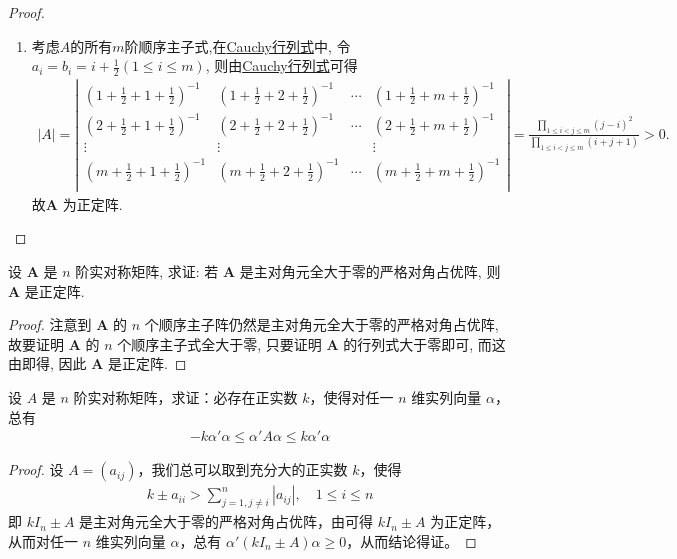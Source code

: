 \documentclass[../../main.tex]{subfiles}%
\begin{document}
\begin{proof}
\begin{enumerate}[(1)]
\item 考虑$A$的所有$m$阶顺序主子式,在\hyperref[Cauchy行列式]{Cauchy行列式}中, 令 \(a_i = b_i = i+\frac{1}{2}(1\leqslant  i\leqslant  m)\), 则由\hyperref[Cauchy行列式]{Cauchy行列式}可得
\begin{align*}
|A|=\left| \begin{matrix}
(1+\frac{1}{2}+1+\frac{1}{2})^{-1}&		(1+\frac{1}{2}+2+\frac{1}{2})^{-1}&		\cdots&		(1+\frac{1}{2}+m+\frac{1}{2})^{-1}\\
(2+\frac{1}{2}+1+\frac{1}{2})^{-1}&		(2+\frac{1}{2}+2+\frac{1}{2})^{-1}&		\cdots&		(2+\frac{1}{2}+m+\frac{1}{2})^{-1}\\
\vdots&		\vdots&		&		\vdots\\
(m+\frac{1}{2}+1+\frac{1}{2})^{-1}&		(m+\frac{1}{2}+2+\frac{1}{2})^{-1}&		\cdots&		(m+\frac{1}{2}+m+\frac{1}{2})^{-1}\\
\end{matrix} \right|=\frac{\prod\limits_{1\leqslant i<j\leqslant m}{\left( j-i \right) ^2}}{\prod\limits_{1\leqslant i<j\leqslant m}{\left( i+j+1 \right)}}>0.
\end{align*}
故\(\boldsymbol{A}\) 为正定阵.
\end{enumerate} 

\end{proof}

\begin{proposition}\label{proposition:主对角元全大于零的严格对角占优阵必正定}
设 \(\boldsymbol{A}\) 是 \(n\) 阶实对称矩阵, 求证: 若 \(\boldsymbol{A}\) 是主对角元全大于零的严格对角占优阵, 则 \(\boldsymbol{A}\) 是正定阵.
\end{proposition}
\begin{proof}

注意到 \(\boldsymbol{A}\) 的 \(n\) 个顺序主子阵仍然是主对角元全大于零的严格对角占优阵, 故要证明 \(\boldsymbol{A}\) 的 \(n\) 个顺序主子式全大于零, 只要证明 \(\boldsymbol{A}\) 的行列式大于零即可, 而这由即得, 因此 \(\boldsymbol{A}\) 是正定阵. 

\end{proof}

\begin{proposition}\label{proposition:例8.50}
设 \(A\) 是 \(n\) 阶实对称矩阵，求证：必存在正实数 \(k\)，使得对任一 \(n\) 维实列向量 \(\alpha\)，总有
\begin{align*}
-k\alpha'\alpha \leqslant  \alpha'A\alpha \leqslant  k\alpha'\alpha
\end{align*}
\end{proposition}
\begin{proof}

设 \(A = (a_{ij})\)，我们总可以取到充分大的正实数 \(k\)，使得
\begin{align*}
k \pm a_{ii} > \sum_{j = 1,j\neq i}^{n}|a_{ij}|,\quad 1\leqslant  i \leqslant  n
\end{align*}
即 \(kI_n \pm A\) 是主对角元全大于零的严格对角占优阵，由可得 \(kI_n \pm A\) 为正定阵，从而对任一 \(n\) 维实列向量 \(\alpha\)，总有 \(\alpha'(kI_n \pm A)\alpha \geqslant  0\)，从而结论得证。 

\end{proof}
\end{document}
